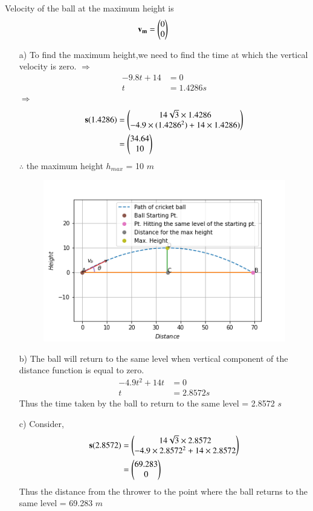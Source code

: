 \documentclass[journal,12pt,twocolumn]{IEEEtran}
\begin{document}
Velocity of the ball at the maximum height is
\begin{align}
    \mathbf{v_m} &= \begin{pmatrix}0 \\ 0\end{pmatrix}
\end{align}
\begin{enumerate}
\item[a)]To find the maximum height,we need to find the time at which the vertical velocity is zero.
$\Longrightarrow$
\begin{align}
    -9.8t+14 &=0\\
    t &= 1.4286 s
    \end{align}
$\Longrightarrow$
\begin{align}
\mathbf{s}(1.4286)&=\begin{pmatrix}14\sqrt{3}\times1.4286\\-4.9\times(1.4286^2)+14\times1.4286)\end{pmatrix}\\
&=\begin{pmatrix}34.64\\10\end{pmatrix}
\end{align}
$\therefore$ the maximum height $h_{max}$ = 10 $m$

\begin{figure}[!ht]
\centering
    \includegraphics[width= \columnwidth]{assignment5.png}
    \caption{} \label{fig:1}
\end{figure}
\item[b)]The ball will return to the same level when vertical component of the distance function is equal to zero.
\begin{align}
    -4.9{t^2}+14t &= 0\\
    t &= 2.8572 s
\end{align}
Thus the time taken by the ball to return to the same level = 2.8572 $s$

\item[c)]Consider,
\begin{align}
    \mathbf{s}(2.8572) &= \begin{pmatrix}14\sqrt{3}\times2.8572\\-4.9\times{2.8572^2}+14\times2.8572\end{pmatrix}\\
    &=\begin{pmatrix}69.283\\0\end{pmatrix}
\end{align}
Thus the distance from the thrower to the point where the ball returns to the same level = 69.283 $m$

\end{enumerate}
\end{document}
